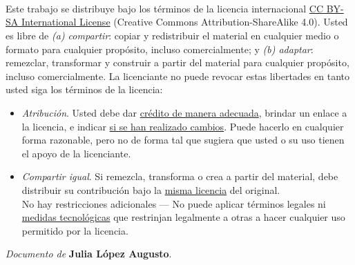 \

\

\

\noindent
Este trabajo se distribuye bajo los términos de la licencia internacional \href{http://creativecommons.org/licenses/by-sa/4.0/}{CC BY-SA International License} (Creative Commons Attribution-ShareAlike 4.0). Usted es libre de \textit{(a) compartir}: copiar y redistribuir el material en cualquier medio o formato para cualquier propósito, incluso comercialmente; y \textit{(b) adaptar}: remezclar, transformar y construir a partir del material para cualquier propósito, incluso comercialmente. La licenciante no puede revocar estas libertades en tanto usted siga los términos de la licencia:

\begin{itemize}
	\item \textit{Atribución}. Usted debe dar \href{https://creativecommons.org/licenses/by-sa/4.0/deed.es#ref-appropriate-credit}{crédito de manera adecuada}, brindar un enlace a la licencia, e indicar \href{https://creativecommons.org/licenses/by-sa/4.0/deed.es#ref-indicate-changes}{si se han realizado cambios}. Puede hacerlo en cualquier forma razonable, pero no de forma tal que sugiera que usted o su uso tienen el apoyo de la licenciante.
	\item \textit{Compartir igual}. Si remezcla, transforma o crea a partir del material, debe distribuir su contribución bajo la \href{https://creativecommons.org/licenses/by-sa/4.0/deed.es#ref-same-license}{misma licencia} del original.\\
	No hay restricciones adicionales — No puede aplicar términos legales ni \href{https://creativecommons.org/licenses/by-sa/4.0/deed.es#ref-technological-measures}{medidas tecnológicas} que restrinjan legalmente a otras a hacer cualquier uso permitido por la licencia.
\end{itemize}


\begin{flushright}
		\vspace{7.0 cm}
		\emph{Documento de} \textbf{Julia López Augusto}. %
\end{flushright}


